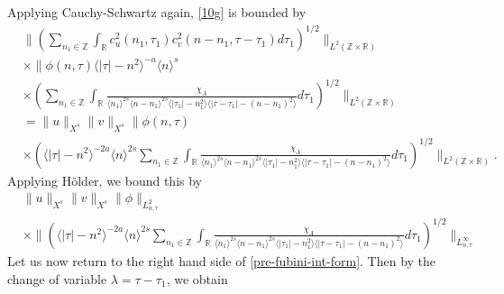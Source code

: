\documentclass[12pt,reqno]{amsart}
\numberwithin{equation}{section}  %
\numberwithin{figure}{section}
\newcommand{\rr}{\mathbb{R}}
\newcommand{\zz}{\mathbb{Z}}
\theoremstyle{plain}
\theoremstyle{definition}
\theoremstyle{remark}
\begin{document}
%
%
Applying Cauchy-Schwartz again, \eqref{10g} is bounded by
%
%
\begin{equation*}
  \begin{split}
  & \|\left( \sum_{n_{1} \in \zz }\int_{\rr } c_{u}^{2}(n_1, \tau_1)
  c_{v}^{2} (n - n_1, \tau - \tau_{1} ) d \tau_1  \right)^{1/2} \|_{L^{2}(\zz \times
		\rr)}
		\\
    & \times  \|\phi(n, \tau) \langle | \tau | - n^{2} \rangle ^{-a} \langle n
    \rangle ^{s}
		\\
    & \times \left( \sum_{n_{1} \in \zz} \int_{\rr} \frac{\chi_{A}}{ \langle n_{1}
    \rangle ^{2s} \langle n-n_{1} \rangle ^{2s} \langle | \tau_{1}|-n_{1}^{2}
    \rangle \langle  |\tau -
    \tau_{1} | -(n - n_{1})^{2}
    \rangle } d \tau_1 \right)^{1/2} \|_{L^2(\zz \times \rr)}
		\\
    & = \|u\|_{X^{s}} \|v\|_{X^{s}} \label{holder-term}
     \|\phi(n, \tau)     \\
    & \times \left( \langle | \tau | - n^{2} \rangle ^{-2a} \langle n
    \rangle ^{2s}
    \sum_{n_{1} \in \zz} \int_{\rr} \frac{\chi_{A}}{ \langle n_{1} \rangle ^{2s} \langle
n-n_{1} \rangle ^{2s}  \langle | \tau_{1}|-n_{1}^{2} \rangle \langle  |\tau -
    \tau_{1} | -(n - n_{1})^{2}
    \rangle } d \tau_1 \right)^{1/2} \|_{L^2(\zz \times \rr)}.
  \end{split}
\end{equation*}
%
Applying H{\"o}lder, we bound this by 
%
%
\begin{equation}
  \label{integral-bound-1st-form-per}
	\begin{split}
    & \|u\|_{X^{s}} \|v\|_{X^{s}} \| \phi \|_{L^{2}_{n, \tau}}
    \\
    & \times \|\left( \langle | \tau | - n^{2} \rangle ^{-2a} \langle n
    \rangle ^{2s}
    \sum_{n_{1} \in \zz} \int_{\rr} \frac{\chi_{A}}{ \langle n_{1} \rangle ^{2s} \langle
n-n_{1} \rangle ^{2s} \langle | \tau_{1}|-n_{1}^{2} \rangle \langle  |\tau -
    \tau_{1} | -(n - n_{1})^{2}
    \rangle  } d \tau_1 \right)^{1/2} \|_{L^\infty_{n, \tau}}
	\end{split}
\end{equation}
%
%
Let us now return to the right hand side of \eqref{pre-fubini-int-form}.
Then by the change of variable $\lambda =
\tau - \tau_{1}$, we obtain
\end{document}
